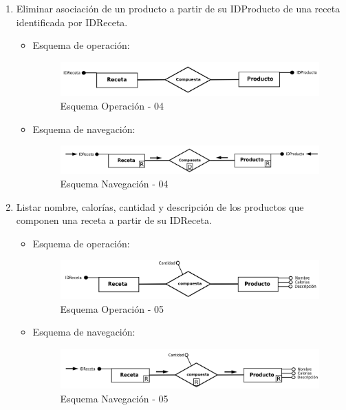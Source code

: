 \documentclass[a4paper,12pt]{report}
\begin{document}
\begin{enumerate}
\item Eliminar asociación de un producto a partir de su IDProducto de
una receta identificada por IDReceta.
\begin{itemize}
\item Esquema de operación:
\begin{figure}[!htp]
\centering
\includegraphics[width=0.9\linewidth]{./operaciones/img/Recetas/04_ope.png}
\caption{Esquema Operación - 04}
\label{fig:ope04}
\medskip
\footnotesize
{}
\end{figure}
\item Esquema de navegación:
\begin{figure}[!htp]
\centering
\includegraphics[width=0.9\linewidth]{./operaciones/img/Recetas/04_nav.png}
\caption{Esquema Navegación - 04}
\label{fig:nave04}
\medskip
\footnotesize
{}
\end{figure}
\end{itemize}

\item Listar nombre, calorías, cantidad y descripción de los productos que
componen una receta a partir de su IDReceta.
\begin{itemize}
\item Esquema de operación:
\begin{figure}[!htp]
\centering
\includegraphics[width=0.9\linewidth]{./operaciones/img/Recetas/05_ope.png}
\caption{Esquema Operación - 05}
\label{fig:ope05}
\medskip
\footnotesize
{}
\end{figure}
\item Esquema de navegación:
\begin{figure}[!htp]
\centering
\includegraphics[width=0.9\linewidth]{./operaciones/img/Recetas/05_nav.png}
\caption{Esquema Navegación - 05}
\label{fig:nave05}
\medskip
\footnotesize
{}
\end{figure}
\end{itemize}
\end{enumerate}
\end{document}
